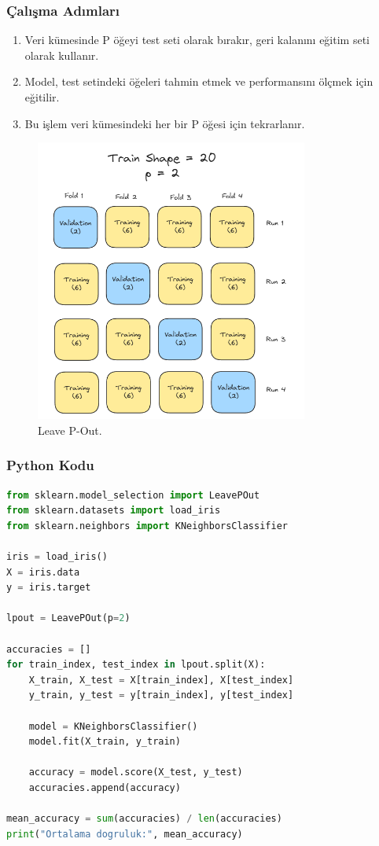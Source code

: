 \subsubsection{Çalışma Adımları}
\begin{enumerate}
    \item Veri kümesinde P öğeyi test seti olarak bırakır, geri kalanını eğitim seti olarak kullanır.
    \item Model, test setindeki öğeleri tahmin etmek ve performansını ölçmek için eğitilir.
    \item Bu işlem veri kümesindeki her bir P öğesi için tekrarlanır.
\end{enumerate}

\begin{figure}[h]
    \centering
    \includegraphics[width=0.8\textwidth]{images/leave_p_out_structure.png}
    \caption{Leave P-Out.}
    \label{fig:enter-label}
\end{figure}

\subsubsection{Python Kodu}

\begin{lstlisting}[language=Python, caption=Scikit-learn'de Leave P-Out örneği.]
from sklearn.model_selection import LeavePOut
from sklearn.datasets import load_iris
from sklearn.neighbors import KNeighborsClassifier

iris = load_iris()
X = iris.data
y = iris.target

lpout = LeavePOut(p=2)

accuracies = []
for train_index, test_index in lpout.split(X):
    X_train, X_test = X[train_index], X[test_index]
    y_train, y_test = y[train_index], y[test_index]
    
    model = KNeighborsClassifier()
    model.fit(X_train, y_train)
    
    accuracy = model.score(X_test, y_test)
    accuracies.append(accuracy)

mean_accuracy = sum(accuracies) / len(accuracies)
print("Ortalama dogruluk:", mean_accuracy)
\end{lstlisting}

